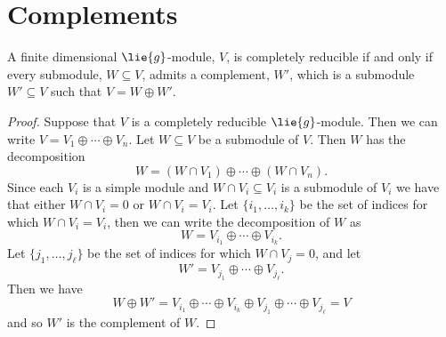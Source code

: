 \documentclass[fleqn]{NotesClass}
\begin{document}
    \section{Complements}
    \begin{lma}{}{}
        A finite dimensional \(\lie{g}\)-module, \(V\), is completely reducible if and only if every submodule, \(W \subseteq V\), admits a complement, \(W'\), which is a submodule \(W' \subseteq V\) such that \(V = W \oplus W'\).
        \begin{proof}
            Suppose that \(V\) is a completely reducible \(\lie{g}\)-module.
            Then we can write \(V = V_1 \oplus \dotsb \oplus V_n\).
            Let \(W \subseteq V\) be a submodule of \(V\).
            Then \(W\) has the decomposition
            \begin{equation}
                W = (W \cap V_1) \oplus \dotsb \oplus (W \cap V_n).
            \end{equation}
            Since each \(V_i\) is a simple module and \(W \cap V_i \subseteq V_i\) is a submodule of \(V_i\) we have that either \(W \cap V_i = 0\) or \(W \cap V_i = V_i\).
            Let \(\{i_1, \dotsc, i_k\}\) be the set of indices for which \(W \cap V_i = V_i\), then we can write the decomposition of \(W\) as
            \begin{equation}
                W = V_{i_1} \oplus \dotsb \oplus V_{i_k}.
            \end{equation}
            Let \(\{j_1, \dotsc, j_\ell\}\) be the set of indices for which \(W \cap V_j = 0\), and let
            \begin{equation}
                W' = V_{j_1} \oplus \dotsb \oplus V_{j_\ell}.
            \end{equation}
            Then we have
            \begin{equation}
                W \oplus W' = V_{i_1} \oplus \dotsb \oplus V_{i_k} \oplus V_{j_1} \oplus \dotsb \oplus V_{j_\ell} = V
            \end{equation}
            and so \(W'\) is the complement of \(W\).
            

\end{proof}
\end{lma}
\end{document}
